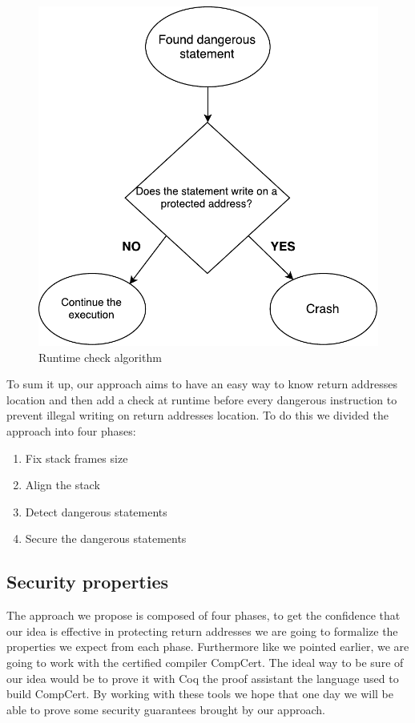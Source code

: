 \documentclass[11pt]{sdm}
\begin{document}
\begin{figure}
\centering
\includegraphics[scale=0.6]{images/runtime_check.pdf}
\caption{Runtime check algorithm}
\label{runtime_check}
\end{figure}

\hfill \break 
	To sum it up, our approach aims to have an easy way to know return addresses location and then add a check at runtime before every dangerous instruction to prevent illegal writing on return addresses location.
To do this we divided the approach into four phases:
\begin{enumerate}
	\item Fix stack frames size
	\item Align the stack
	\item Detect dangerous statements
	\item Secure the dangerous statements
\end{enumerate}


\subsection{Security properties}
\label{sub:Security properties}
	The approach we propose is composed of four phases, to get the confidence that our idea is effective in protecting return addresses we are going to formalize the properties we expect from each phase. 
Furthermore like we pointed earlier, we are going to work with the certified compiler CompCert.
The ideal way to be sure of our idea would be to prove it with Coq the proof assistant the language used to build CompCert.
By working with these tools we hope that one day we will be able to prove some security guarantees brought by our approach.
\end{document}
